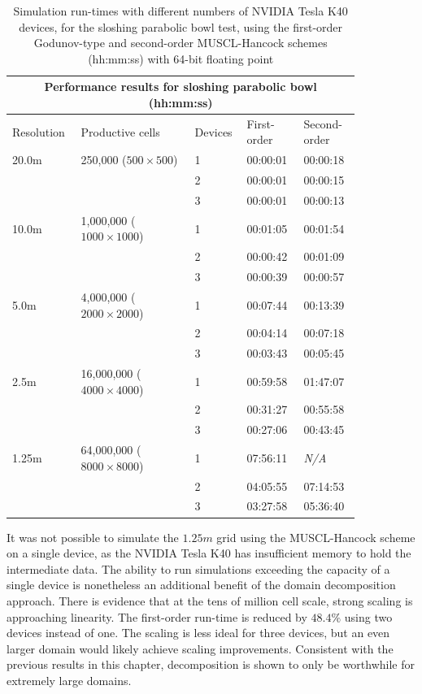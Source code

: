 \begin{table}[p]
	\small
	\centering
	\caption{Simulation run-times with different numbers of NVIDIA Tesla K40 devices, for the sloshing parabolic bowl test, using the first-order Godunov-type and second-order MUSCL-Hancock schemes (hh:mm:ss) with 64-bit floating point}
	\label{PerformanceResults_MultiGPU_SloshingBowl}
	\begin{tabular}{p{0.15\linewidth}p{0.3\linewidth}p{0.1\linewidth}p{0.15\linewidth}p{0.15\linewidth}}
		\hline
		\multicolumn{5}{c}{\textbf{Performance results for sloshing parabolic bowl (hh:mm:ss)}} \\
		\hline
		Resolution		 	& Productive cells						& Devices	& First-order	& Second-order	\\
		\hline
		20.0m				& 250,000 ($500 \times 500$)			& 1			& 00:00:01		& 00:00:18	\\
		&															& 2			& 00:00:01		& 00:00:15	\\
		&															& 3			& 00:00:01		& 00:00:13 	\\
		\hline
		10.0m				& 1,000,000 ($1000 \times 1000$)		& 1			& 00:01:05		& 00:01:54	\\
		&															& 2			& 00:00:42		& 00:01:09	\\
		&															& 3			& 00:00:39		& 00:00:57	\\
		\hline
		5.0m				& 4,000,000 ($2000 \times 2000$)		& 1			& 00:07:44		& 00:13:39 	\\
		&															& 2			& 00:04:14		& 00:07:18	\\
		&															& 3			& 00:03:43		& 00:05:45  \\
		\hline
		2.5m				& 16,000,000 ($4000 \times 4000$)		& 1			& 00:59:58		& 01:47:07	\\
		&															& 2			& 00:31:27		& 00:55:58	\\
		&															& 3			& 00:27:06		& 00:43:45	\\
		\hline
		1.25m				& 64,000,000 ($8000 \times 8000$)		& 1			& 07:56:11		& \textit{N/A}	\\
		&															& 2			& 04:05:55		& 07:14:53	\\
		&															& 3			& 03:27:58		& 05:36:40	\\
		\hline
	\end{tabular}
\end{table}

It was not possible to simulate the $1.25m$ grid using the MUSCL-Hancock scheme on a single device, as the NVIDIA Tesla K40 has insufficient memory to hold the intermediate data. The ability to run simulations exceeding the capacity of a single device is nonetheless an additional benefit of the domain decomposition approach. There is evidence that at the tens of million cell scale, strong scaling is approaching linearity. The first-order run-time is reduced by $48.4\%$ using two devices instead of one. The scaling is less ideal for three devices, but an even larger domain would likely achieve scaling improvements. Consistent with the previous results in this chapter, decomposition is shown to only be worthwhile for extremely large domains.

